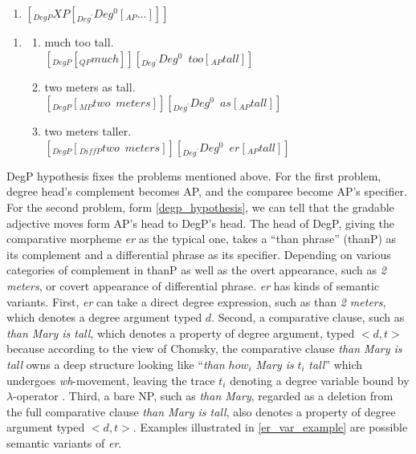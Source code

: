 \documentclass{ctexart}
\let \cite \parencite
\begin{document}
\begin{enumerate}
    \item \label{abney_deg_p} $[_{DegP} XP [_{Deg^{\prime}}Deg^0[_{AP}...]]] $
\end{enumerate}

\begin{enumerate}
    \item \label{abney_deg_p_example}
    \begin{enumerate}
        \item \label{abney_deg_p_example_1}
        much too tall.\\
        $[_{DegP} [_{QP} much]] [_{Deg^{\prime}}Deg^0 \enspace too [_{AP}tall]] $
        \item \label{abney_deg_p_example_2}
        two meters as tall.\\
        $[_{DegP} [_{MP} two \enspace meters]] [_{Deg^{\prime}}Deg^0 \enspace as [_{AP}tall]] $
        \item \label{abney_deg_p_example_3}
        two meters taller.\\
        $[_{DegP} [_{DiffP} two \enspace meters]] [_{Deg^{\prime}}Deg^0 \enspace er [_{AP}tall]] $

    \end{enumerate}
\end{enumerate}

DegP hypothesis fixes the problems mentioned above. For the first problem, degree head's complement becomes AP, and the comparee become AP's specifier. For the second problem, form \ref{degp_hypothesis}, we can tell that the gradable adjective moves form AP's head to DegP's head. The head of DegP, giving the comparative morpheme \textit{er} as the typical one, takes a ``than phrase'' (thanP) as its complement and a differential phrase as its specifier. Depending on various categories of complement in thanP as well as the overt appearance, such as \textit{2 meters}, or covert appearance of differential phrase. \textit{er} has kinds of semantic variants. First, \textit{er} can take a direct degree expression, such as than \textit{2 meters}, which denotes a degree argument typed $d$. Second, a comparative clause, such as \textit{than Mary is tall}, which denotes a property of degree argument, typed $<d,t>$ because according to the view of Chomsky, the comparative clause \textit{than Mary is tall} owns a deep structure looking like ``\textit{than} $how_i$ \textit{Mary is} $t_i$ \textit{tall}'' which undergoes \textit{wh}-movement, leaving the trace $t_i$ denoting a degree variable bound by $\lambda$-operator \cite{chomsky1977}. Third, a bare NP, such as \textit{than Mary}, regarded as a deletion from the full comparative clause \textit{than Mary is tall}, also denotes a property of degree argument typed $<d,t>$. Examples illustrated in \ref{er_var_example} are possible semantic variants of \textit{er}.
\end{document}
